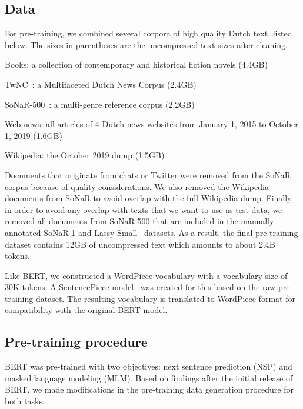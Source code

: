 \documentclass[11pt]{article}
\begin{document}
\subsection{Data}
For pre-training, we combined several corpora of high quality Dutch text, listed below.
The sizes in parentheses are the uncompressed text sizes after cleaning.

\begin{itemize*}
    \item Books: a collection of contemporary and historical fiction novels (4.4GB)
    \item TwNC~\citep{ordelman2007twnc}: a Multifaceted Dutch News Corpus (2.4GB)
    \item SoNaR-500~\citep{sonar500}: a multi-genre reference corpus (2.2GB)
    \item Web news: all articles of 4 Dutch news websites from January 1, 2015 to October 1, 2019 (1.6GB)
    \item Wikipedia: the October 2019 dump (1.5GB)
\end{itemize*}

Documents that originate from chats or Twitter were removed from the SoNaR corpus because of quality considerations.
We also removed the Wikipedia documents from SoNaR to avoid overlap with the full Wikipedia dump.
Finally, in order to avoid any overlap with texts that we want to use as test data, we removed all documents from SoNaR-500 that are included in the manually annotated SoNaR-1 and Lassy Small~\citep{lassy} datasets. As a result, the final pre-training dataset contains 12GB of uncompressed text which amounts to about 2.4B tokens.

Like BERT, we constructed a WordPiece vocabulary with a vocabulary size of 30K tokens.
A SentencePiece model~\citep{kudo2018sentencepiece} was created for this based on the raw pre-training dataset.
The resulting vocabulary is translated to WordPiece format for compatibility with the original BERT model.

\subsection{Pre-training procedure}
BERT was pre-trained with two objectives:
next sentence prediction (NSP) and masked language modeling (MLM).
Based on findings after the initial release of BERT, we made modifications in the pre-training data generation procedure for both tasks.
\end{document}
